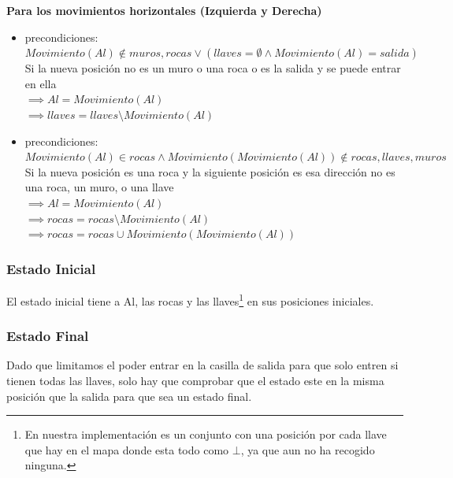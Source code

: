 \documentclass[11pt,spanish]{article}
\begin{document}
			\textbf{Para los movimientos horizontales (Izquierda y Derecha)}
			\begin{itemize}
				\item precondiciones: $Movimiento(Al) \notin muros, rocas \lor (llaves = \emptyset \land Movimiento(Al) = salida)$\\Si la nueva posición no es un muro o una roca o es la salida y se puede entrar en ella\\
				$\implies Al = Movimiento(Al)$\\
				$\implies llaves = llaves\setminus Movimiento(Al)$
				\item precondiciones: $Movimiento(Al) \in rocas \land Movimiento(Movimiento(Al)) \notin rocas, llaves, muros$\\Si la nueva posición es una roca y la siguiente posición es esa dirección no es una roca, un muro, o una llave\\
				$\implies Al = Movimiento(Al)$\\
				$\implies rocas = rocas\setminus Movimiento(Al)$\\
				$\implies rocas = rocas \cup Movimiento(Movimiento(Al))$
			\end{itemize}
		\subsubsection{Estado Inicial}
			El estado inicial tiene a Al, las rocas y las llaves\footnote{En nuestra implementación es un conjunto con una posición por cada llave que hay en el mapa donde esta todo como $\bot$, ya que aun no ha recogido ninguna.} en sus posiciones iniciales.
		\subsubsection{Estado Final}
			Dado que limitamos el poder entrar en la casilla de salida para que solo entren si tienen todas las llaves, solo hay que comprobar que el estado este en la misma posición que la salida para que sea un estado final.
\end{document}
